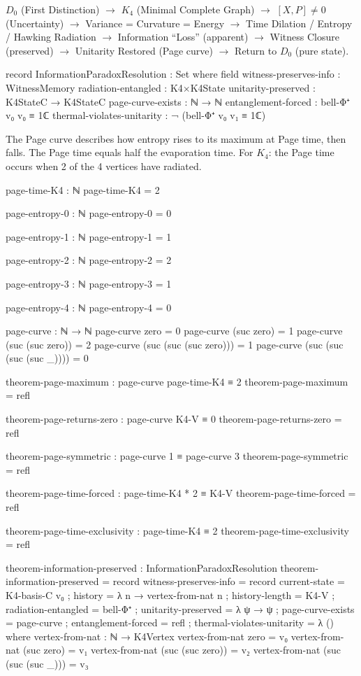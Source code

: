 \documentclass[11pt,a4paper]{book}
\begin{document}
\begin{center}
$D_0$ (First Distinction) $\to$ $K_4$ (Minimal Complete Graph) $\to$ $[X,P] \neq 0$ (Uncertainty) $\to$ Variance = Curvature = Energy $\to$ Time Dilation / Entropy / Hawking Radiation $\to$ Information ``Loss'' (apparent) $\to$ Witness Closure (preserved) $\to$ Unitarity Restored (Page curve) $\to$ Return to $D_0$ (pure state).
\end{center}

\begin{code}
record InformationParadoxResolution : Set where
  field
    witness-preserves-info : WitnessMemory
    radiation-entangled : K4×K4State
    unitarity-preserved : K4StateC → K4StateC
    page-curve-exists : ℕ → ℕ
    entanglement-forced : bell-Φ⁺ v₀ v₀ ≡ 1ℂ
    thermal-violates-unitarity : ¬ (bell-Φ⁺ v₀ v₁ ≡ 1ℂ)
\end{code}

The Page curve describes how entropy rises to its maximum at Page time, then falls. The Page time equals half the evaporation time. For $K_4$: the Page time occurs when 2 of the 4 vertices have radiated.

\begin{code}
page-time-K4 : ℕ
page-time-K4 = 2

page-entropy-0 : ℕ
page-entropy-0 = 0

page-entropy-1 : ℕ
page-entropy-1 = 1

page-entropy-2 : ℕ
page-entropy-2 = 2

page-entropy-3 : ℕ
page-entropy-3 = 1

page-entropy-4 : ℕ
page-entropy-4 = 0

page-curve : ℕ → ℕ
page-curve zero = 0
page-curve (suc zero) = 1
page-curve (suc (suc zero)) = 2
page-curve (suc (suc (suc zero))) = 1
page-curve (suc (suc (suc (suc _)))) = 0

theorem-page-maximum : page-curve page-time-K4 ≡ 2
theorem-page-maximum = refl

theorem-page-returns-zero : page-curve K4-V ≡ 0
theorem-page-returns-zero = refl

theorem-page-symmetric : page-curve 1 ≡ page-curve 3
theorem-page-symmetric = refl

theorem-page-time-forced : page-time-K4 * 2 ≡ K4-V
theorem-page-time-forced = refl

theorem-page-time-exclusivity : page-time-K4 ≡ 2
theorem-page-time-exclusivity = refl

theorem-information-preserved : InformationParadoxResolution
theorem-information-preserved = record
  { witness-preserves-info = record 
      { current-state = K4-basis-C v₀
      ; history = λ n → vertex-from-nat n
      ; history-length = K4-V }
  ; radiation-entangled = bell-Φ⁺
  ; unitarity-preserved = λ ψ → ψ
  ; page-curve-exists = page-curve
  ; entanglement-forced = refl
  ; thermal-violates-unitarity = λ ()
  }
  where
    vertex-from-nat : ℕ → K4Vertex
    vertex-from-nat zero = v₀
    vertex-from-nat (suc zero) = v₁
    vertex-from-nat (suc (suc zero)) = v₂
    vertex-from-nat (suc (suc (suc _))) = v₃
\end{code}
\end{document}
